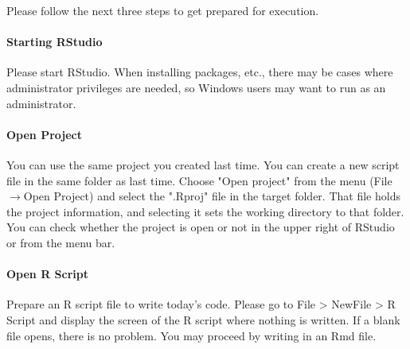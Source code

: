 \documentclass{ltjbook}
\begin{document}
Please follow the next three steps to get prepared for execution.
\paragraph{Starting RStudio} Please start RStudio. When installing packages, etc., there may be cases where administrator privileges are needed, so Windows users may want to run as an administrator.
\paragraph{Open Project} You can use the same project you created last time. You can create a new script file in the same folder as last time. Choose "Open project" from the menu (File$\to$Open Project) and select the ".Rproj" file in the target folder. That file holds the project information, and selecting it sets the working directory to that folder. You can check whether the project is open or not in the upper right of RStudio or from the menu bar.
\paragraph{Open R Script} Prepare an R script file to write today's code. Please go to File > NewFile > R Script and display the screen of the R script where nothing is written. If a blank file opens, there is no problem. You may proceed by writing in an Rmd file.
\end{document}

